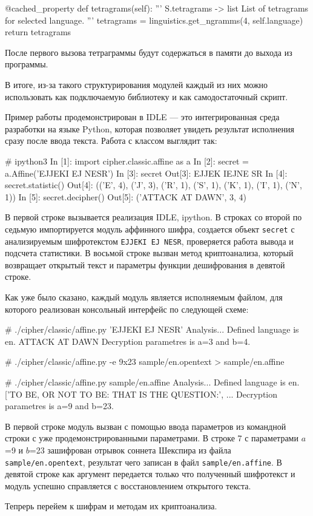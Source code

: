 \begin{listing}[1]{1}
@cached_property
def tetragrams(self):
    '''
    S.tetragrams -> list
    List of tetragrams for selected language.
    '''
    tetragrams = linguistics.get_ngramms(4, self.language)
    return tetragrams
\end{listing}

После первого вызова тетраграммы будут содержаться в 
памяти до выхода из программы.

В итоге, из-за такого структурирования модулей каждый из них
можно использовать как подключаемую библиотеку и как
самодостаточный скрипт.

Пример работы продемонстрирован в IDLE --- это интегрированная среда 
разработки на языке Python, которая позволяет увидеть результат
исполнения сразу после ввода текста.
Работа с классом выглядит так:

\begin{listing}[1]{1}
# ipython3
In [1]: import cipher.classic.affine as a
In [2]: secret = a.Affine('EJJEKI EJ NESR')
In [3]: secret
Out[3]: EJJEK IEJNE SR
In [4]: secret.statistic()
Out[4]: (('E', 4), ('J', 3), ('R', 1), ('S', 1), ('K', 1), ('I', 1), ('N', 1))
In [5]: secret.decipher()
Out[5]: ('ATTACK AT DAWN', 3, 4)
\end{listing}

В первой строке вызывается реализация IDLE, ipython.
В строках со второй по седьмую импортируется модуль
аффинного шифра, создается объект \texttt{secret} с анализируемым
шифротекстом \texttt{EJJEKI EJ NESR}, проверяется работа
вывода и подсчета статистики.
В восьмой строке вызван метод криптоанализа, который
возвращает открытый текст и параметры функции дешифрования 
в девятой строке.

Как уже было сказано,
каждый модуль является исполняемым файлом, для которого
реализован консольный интерфейс по следующей схеме:

\begin{listing}[1]{1}
# ./cipher/classic/affine.py 'EJJEKI EJ NESR'
Analysis...
Defined language is en.
ATTACK AT DAWN
Decryption parametres is a=3 and b=4.

# ./cipher/classic/affine.py -e 9x23 sample/en.opentext > sample/en.affine

# ./cipher/classic/affine.py sample/en.affine 
Analysis...
Defined language is en.
['TO BE, OR NOT TO BE: THAT IS THE QUESTION:', ... 
Decryption parametres is a=9 and b=23.
\end{listing}

В первой строке модуль вызван с помощью ввода параметров из 
командной строки с уже продемонстрированными параметрами.
В строке 7 с параметрами $a$=9 и $b$=23 зашифрован отрывок
соннета Шекспира из файла \texttt{sample/en.opentext},
результат чего записан в файл \texttt{sample/en.affine}.
В девятой строке как аргумент передается только что 
полученный шифротекст и модуль успешно справляется 
с восстановлением открытого текста.

Тепрерь перейем к шифрам и методам их криптоанализа.
